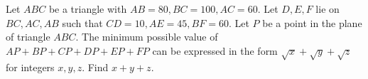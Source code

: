 Let $ABC$ be a triangle with $AB = 80, BC = 100, AC = 60$. Let $D, E, F$ lie on $BC, AC, AB$ such that $CD = 10, AE = 45, BF = 60$. Let $P$ be a point in the plane of triangle $ABC$. The minimum possible value of $AP+BP+CP+DP+EP+FP$ can be expressed in the form $\sqrt{x}+\sqrt{y}+\sqrt{z}$ for integers $x, y, z$. Find $x+y+z$.
